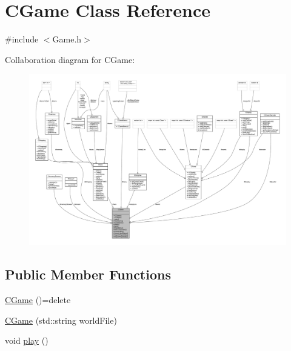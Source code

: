 \hypertarget{class_c_game}{}\section{C\+Game Class Reference}
\label{class_c_game}


{\ttfamily \#include $<$Game.\+h$>$}



Collaboration diagram for C\+Game\+:\nopagebreak
\begin{figure}[H]
\begin{center}
\leavevmode
\includegraphics[width=350pt]{class_c_game__coll__graph}
\end{center}
\end{figure}
\subsection*{Public Member Functions}
\begin{DoxyCompactItemize}
\item 
\mbox{\hyperlink{class_c_game_a3b905a36ecee2a2da44efb2024812442}{C\+Game}} ()=delete
\item 
\mbox{\hyperlink{class_c_game_af5435e79a93dd92991ae24b499976470}{C\+Game}} (std\+::string world\+File)
\item 
void \mbox{\hyperlink{class_c_game_aa9d3da2fefa1c04faefc6586dbd37971}{play}} ()
\end{DoxyCompactItemize}
